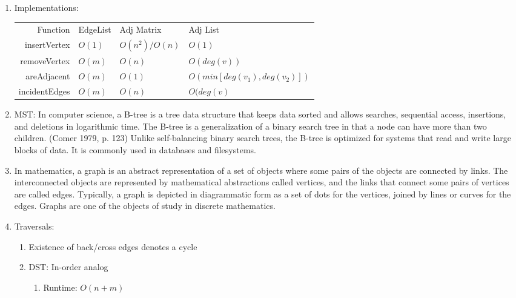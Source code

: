 \documentclass[12pt]{article}
\renewcommand{\=}[1]{\stackrel{#1}{=}} %
\theoremstyle{definition}
\theoremstyle{remark}
\begin{document}
\begin{enumerate}
\begin{enumerate}
    \item Implementations: 
      \begin{tabular}{ r l l l }
        Function & EdgeList & Adj Matrix & Adj List \\
        insertVertex & $O(1)$ & $O(n^2)/O(n)$ & $O(1)$ \\
        removeVertex & $O(m)$ & $O(n)$ & $O(deg(v))$ \\
        areAdjacent & $O(m)$ & $O(1)$ & $O(min[deg(v_1),deg(v_2)])$\\
        incidentEdges & $O(m)$ & $O(n)$ & $O(deg(v)$\\
      \end{tabular}


    \item MST: In computer science, a B-tree is a tree data structure that keeps data sorted and allows searches, sequential access, insertions, and deletions in logarithmic time. The B-tree is a generalization of a binary search tree in that a node can have more than two children. (Comer 1979, p. 123) Unlike self-balancing binary search trees, the B-tree is optimized for systems that read and write large blocks of data. It is commonly used in databases and filesystems.
    \item In mathematics, a graph is an abstract representation of a set of objects where some pairs of the objects are connected by links. The interconnected objects are represented by mathematical abstractions called vertices, and the links that connect some pairs of vertices are called edges. Typically, a graph is depicted in diagrammatic form as a set of dots for the vertices, joined by lines or curves for the edges. Graphs are one of the objects of study in discrete mathematics.
    \item Traversals:
      \begin{enumerate}
      \item Existence of back/cross edges denotes a cycle
      \item DST: In-order analog
        \begin{enumerate}
        \item Runtime: $O(n+m)$
        \end{enumerate}


\end{enumerate}
\end{enumerate}
\end{enumerate}
\end{document}
